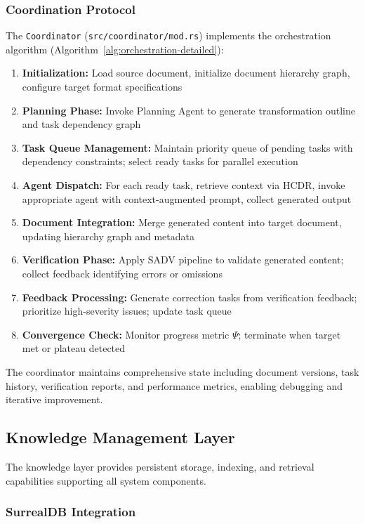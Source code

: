\documentclass{ieeeaccess}
\begin{document}
\subsubsection{Coordination Protocol}

The \texttt{Coordinator} (\texttt{src/coordinator/mod.rs}) implements the orchestration algorithm (Algorithm~\ref{alg:orchestration-detailed}):

\begin{enumerate}
\item \textbf{Initialization:} Load source document, initialize document hierarchy graph, configure target format specifications
\item \textbf{Planning Phase:} Invoke Planning Agent to generate transformation outline and task dependency graph
\item \textbf{Task Queue Management:} Maintain priority queue of pending tasks with dependency constraints; select ready tasks for parallel execution
\item \textbf{Agent Dispatch:} For each ready task, retrieve context via HCDR, invoke appropriate agent with context-augmented prompt, collect generated output
\item \textbf{Document Integration:} Merge generated content into target document, updating hierarchy graph and metadata
\item \textbf{Verification Phase:} Apply SADV pipeline to validate generated content; collect feedback identifying errors or omissions
\item \textbf{Feedback Processing:} Generate correction tasks from verification feedback; prioritize high-severity issues; update task queue
\item \textbf{Convergence Check:} Monitor progress metric \(\Psi\); terminate when target met or plateau detected
\end{enumerate}

The coordinator maintains comprehensive state including document versions, task history, verification reports, and performance metrics, enabling debugging and iterative improvement.

\subsection{Knowledge Management Layer}

The knowledge layer provides persistent storage, indexing, and retrieval capabilities supporting all system components.

\subsubsection{SurrealDB Integration}
\end{document}
